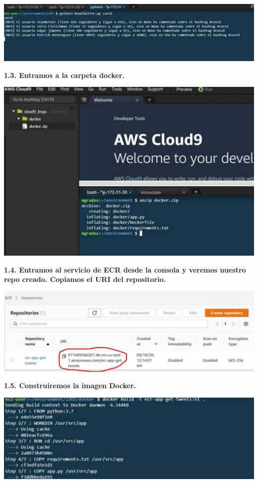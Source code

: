 \documentclass{article}
\begin{document}
    \begin{center}
		\includegraphics[width=15cm]{./images/2} 
	\end{center}

\textbf{1.3.   Entramos a la carpeta docker.
}

    \begin{center}
		\includegraphics[width=15cm]{./images/3} 
	\end{center}

\newpage
\textbf{1.4.  Entramos al servicio de ECR desde la consola y veremos nuestro repo creado.
Copiamos el URI del repositorio.
}

    \begin{center}
		\includegraphics[width=15cm]{./images/4} 
	\end{center}
	
	\newpage
\textbf{1.5.  Construiremos la imagen Docker.
}

    \begin{center}
		\includegraphics[width=15cm]{./images/5} 
	\end{center}
	
\end{document}

